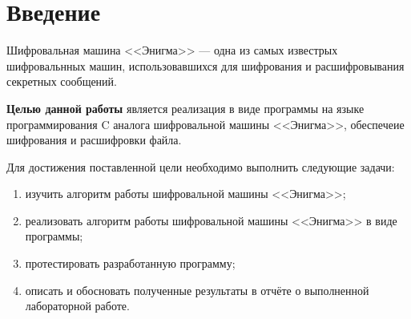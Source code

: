 \chapter*{Введение}

Шифровальная машина <<Энигма>> --- одна из самых известрых шифровальнных машин, использовавшихся для шифрования и расшифровывания секретных сообщений.

\textbf{Целью данной работы} является реализация в виде программы на языке программирования C аналога шифровальной машины <<Энигма>>, обеспечеие шифрования и расшифровки файла. 

Для достижения поставленной цели необходимо выполнить следующие задачи:
\begin{enumerate}[label=\arabic*)]
	\item изучить алгоритм работы шифровальной машины <<Энигма>>;
    \item реализовать алгоритм работы шифровальной машины <<Энигма>> в виде программы;
	\item протестировать разработанную программу;
	\item описать и обосновать полученные результаты в отчёте о выполненной лабораторной работе.
\end{enumerate}